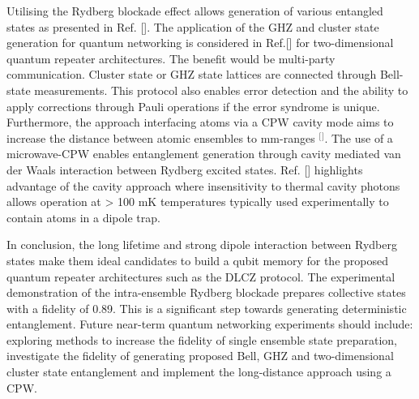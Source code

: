 Utilising the Rydberg blockade effect allows generation of various entangled states as presented in Ref. [\citep{Nielsen2010DeterministicProcessing}]. The application of the GHZ and cluster state generation for quantum networking is considered in Ref.[] for two-dimensional quantum repeater architectures. The benefit would be multi-party communication. Cluster state or GHZ state lattices are connected through Bell-state measurements. This protocol also enables error detection and the ability to apply corrections through Pauli operations if the error syndrome is unique. Furthermore, the approach interfacing atoms via a CPW cavity mode aims to increase the distance between atomic ensembles to mm-ranges $^{[}$\citep{Petrosyan2008QuantumResonators}$^{]}$. The use of a microwave-CPW enables entanglement generation through cavity mediated van der Waals interaction between Rydberg excited states. Ref. [] highlights advantage of the cavity approach where insensitivity to thermal cavity photons allows operation at > 100 mK temperatures typically used experimentally to contain atoms in a dipole trap. 

In conclusion, the long lifetime and strong dipole interaction between Rydberg states make them ideal candidates to build a qubit memory for the proposed quantum repeater architectures such as the DLCZ protocol. The experimental demonstration of the intra-ensemble Rydberg blockade prepares collective states with a fidelity of 0.89. This is a significant step towards generating deterministic entanglement. Future near-term quantum networking experiments should include: exploring methods to increase the fidelity of single ensemble state preparation, investigate the fidelity of generating proposed Bell, GHZ and two-dimensional cluster state entanglement and implement the long-distance approach using a CPW. 






